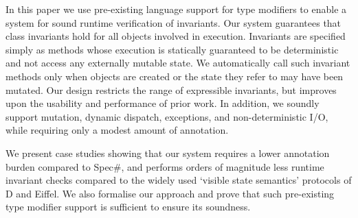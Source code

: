 In this paper we use pre-existing language support for type modifiers to enable a system for sound runtime verification of invariants.
Our system guarantees that class invariants hold for all objects involved in execution.
Invariants are specified simply as methods whose execution is statically guaranteed to be deterministic and not access any externally mutable state.
We automatically call such invariant methods only when objects are created or the state they refer to may have been mutated.
Our design restricts the range of expressible invariants, but improves upon the usability and performance of prior work.
In addition, we soundly support mutation, dynamic dispatch, exceptions, and non-deterministic I/O, while requiring only a modest amount of annotation.

We present case studies showing that our system requires a lower annotation burden compared to Spec\#, and  performs orders of magnitude less runtime invariant checks compared to the widely used `visible state semantics' protocols of D and Eiffel.
We also formalise our approach and prove that such pre-existing type modifier support is sufficient to ensure its soundness. %